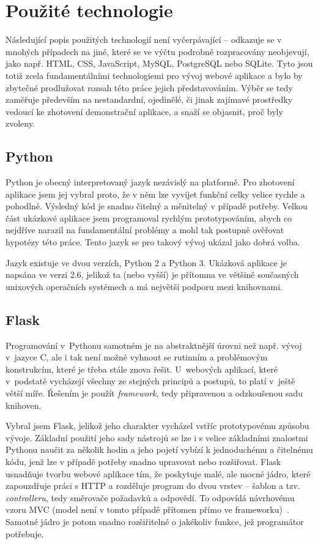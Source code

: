 \documentclass[12pt,oneside,final]{fithesis2}
\begin{document}
\section{Použité technologie}
Následující popis použitých technologií není vyčerpávající -- odkazuje se v mnohých případech na jiné, které se ve výčtu podrobně rozpracovány neobjevují, jako např. HTML, CSS, JavaScript, MySQL, PostgreSQL nebo SQLite. Tyto jsou totiž zcela fundamentálními technologiemi pro vývoj webové aplikace a bylo by zbytečné prodlužovat rozsah této práce jejich představováním. Výběr se tedy zaměřuje především na nestandardní, ojedinělé, či jinak zajímavé prostředky vedoucí ke zhotovení demonstrační aplikace, a snaží se objasnit, proč byly zvoleny.

\subsection{Python}
Python je obecný interpretovaný jazyk nezávislý na platformě. Pro zhotovení aplikace jsem jej vybral proto, že v něm lze vyvíjet funkční celky velice rychle a pohodlně. Výsledný kód je snadno čitelný a měnitelný v případě potřeby. Velkou část ukázkové aplikace jsem programoval rychlým prototypováním, abych co nejdříve narazil na fundamentální problémy a mohl tak postupně ověřovat hypotézy této práce. Tento jazyk se pro takový vývoj ukázal jako dobrá volba.

Jazyk existuje ve dvou verzích, Python 2 a Python 3. Ukázková aplikace je napsána ve verzi 2.6, jelikož ta (nebo vyšší) je přítomna ve většině současných unixových operačních systémech a má největší podporu mezi knihovnami.

\subsection{Flask}
Programování v~Pythonu samotném je na abstraktnější úrovni než např. vývoj v~jazyce C, ale i tak není možné vyhnout se rutinním a problémovým konstrukcím, které je třeba stále znova řešit. U~webových aplikací, které v~podstatě vycházejí všechny ze stejných principů a postupů, to platí v~ještě větší míře. Řešením je použít \emph{framework}, tedy připravenou a odzkoušenou sadu knihoven.

Vybral jsem  Flask, jelikož jeho charakter vycházel vstříc prototypovému způsobu vývoje. Základní použití jeho sady nástrojů se lze i s velice základními znalostmi Pythonu naučit za několik hodin a jeho pojetí vybízí k jednoduchému a čitelnému kódu, jenž lze v případě potřeby snadno upravovat nebo rozšiřovat. Flask usnadňuje tvorbu webové aplikace tím, že poskytuje malé, ale mocné jádro, které zapouzdřuje práci s HTTP a rozděluje program do dvou vrstev -- šablon a tzv. \emph{controlleru}, tedy směrovače požadavků a odpovědí. To odpovídá návrhovému vzoru MVC (model není v tomto případě přítomen přímo ve frameworku)~\cite{bernard2009serial}. Samotné jádro je potom snadno rozšiřitelné o jakékoliv funkce, jež programátor potřebuje.
\end{document}

